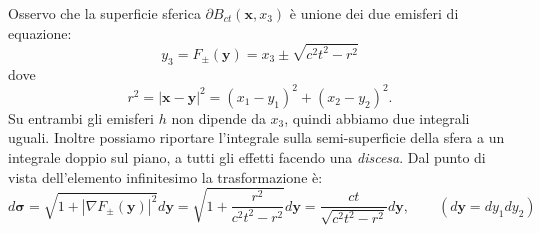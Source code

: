 \documentclass[10pt,a4paper,twoside,openright]{book}
\newcommand{\x}{\mathbf{x}}
\newcommand{\y}{\mathbf{y}}
\begin{document}
Osservo che la superficie sferica $\displaystyle \partial B_{ct}(\x ,x_{3})$ è unione dei due emisferi di equazione:
\begin{equation*}
	y_{3} =F_{\pm }(\y) =x_{3} \pm \sqrt{c^{2} t^{2} -r^{2}}
\end{equation*}
dove
\begin{equation*}
	r^{2} =| \x -\y| ^{2} =( x_{1} -y_{1})^{2} +( x_{2} -y_{2})^{2} .
\end{equation*}
Su entrambi gli emisferi $\displaystyle h$ non dipende da $\displaystyle x_{3}$, quindi abbiamo due integrali uguali. Inoltre possiamo riportare l'integrale sulla semi-superficie della sfera a un integrale doppio sul piano, a tutti gli effetti facendo una \textit{discesa}. Dal punto di vista dell'elemento infinitesimo la trasformazione è:
\begin{equation*}
	d\bm{\sigma } =\sqrt{1+| \nabla F_{\pm }(\y)| ^{2}} d\y =\sqrt{1+\frac{r^{2}}{c^{2} t^{2} -r^{2}}} d\y =\frac{ct}{\sqrt{c^{2} t^{2} -r^{2}}} d\y,\qquad  ( d\y =dy_{1} dy_{2})
\end{equation*}
\end{document}
